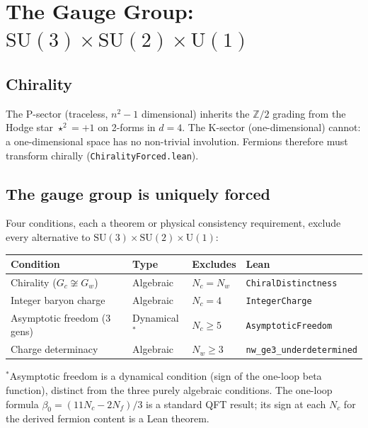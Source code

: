 \documentclass[11pt,letterpaper]{article}
\theoremstyle{remark}
\newcommand{\lean}[1]{\texttt{\small #1}}
\begin{document}
\section{The Gauge Group: $\mathrm{SU}(3) \times \mathrm{SU}(2) \times \mathrm{U}(1)$}
\label{sec:gauge}

\subsection{Chirality}

The P-sector (traceless, $n^2 - 1$ dimensional) inherits the
$\mathbb{Z}/2$ grading from the Hodge star $\star^2 = +1$ on 2-forms
in $d = 4$. The K-sector (one-dimensional) cannot: a one-dimensional
space has no non-trivial involution. Fermions therefore must transform
chirally (\lean{ChiralityForced.lean}).

\subsection{The gauge group is uniquely forced}

Four conditions, each a theorem or physical consistency requirement,
exclude every alternative to $\mathrm{SU}(3) \times \mathrm{SU}(2)
\times \mathrm{U}(1)$:

\begin{center}
\begin{tabular}{@{}llll@{}}
\toprule
Condition & Type & Excludes & Lean \\
\midrule
Chirality ($G_c \not\cong G_w$) & Algebraic & $N_c = N_w$ &
  \lean{ChiralDistinctness} \\
Integer baryon charge & Algebraic & $N_c = 4$ &
  \lean{IntegerCharge} \\
Asymptotic freedom (3 gens) & Dynamical$^*$ & $N_c \geq 5$ &
  \lean{AsymptoticFreedom} \\
Charge determinacy & Algebraic & $N_w \geq 3$ &
  \lean{nw\_ge3\_underdetermined} \\
\bottomrule
\end{tabular}
\end{center}

\noindent $^*$Asymptotic freedom is a dynamical condition
(sign of the one-loop beta function), distinct from the three
purely algebraic conditions. The one-loop formula
$\beta_0 = (11 N_c - 2 N_f)/3$ is a standard QFT result; its sign
at each $N_c$ for the derived fermion content is a Lean theorem.
\end{document}
